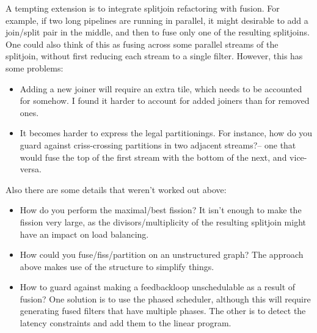 \documentclass[12pt]{article}
\begin{document}
  A tempting extension is to integrate splitjoin refactoring with
  fusion.  For example, if two long pipelines are running in parallel,
  it might desirable to add a join/split pair in the middle, and then
  to fuse only one of the resulting splitjoins.  One could also think
  of this as fusing across some parallel streams of the splitjoin,
  without first reducing each stream to a single filter.  However,
  this has some problems:
  \begin{itemize}

    \item Adding a new joiner will require an extra tile, which needs
    to be accounted for somehow.  I found it harder to account for
    added joiners than for removed ones.

    \item It becomes harder to express the legal partitionings.  For
    instance, how do you guard against criss-crossing partitions in
    two adjacent streams?-- one that would fuse the top of the first
    stream with the bottom of the next, and vice-versa.

  \end{itemize}
  Also there are some details that weren't worked out above:
  \begin{itemize}

    \item How do you perform the maximal/best fission?  It isn't
    enough to make the fission very large, as the
    divisors/multiplicity of the resulting splitjoin might have an
    impact on load balancing.

    \item How could you fuse/fiss/partition on an unstructured graph?
    The approach above makes use of the structure to simplify things.

    \item How to guard against making a feedbackloop unschedulable as
    a result of fusion?  One solution is to use the phased scheduler,
    although this will require generating fused filters that have
    multiple phases.  The other is to detect the latency constraints
    and add them to the linear program.
    
  \end{itemize}
\end{document}

